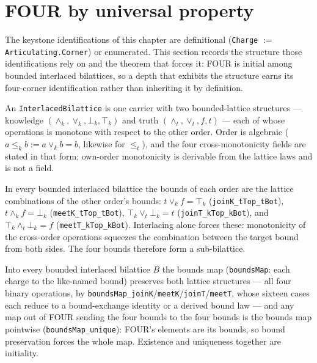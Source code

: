 \section{FOUR by universal property}

The keystone identifications of this chapter are definitional
(\texttt{Charge} $:=$ \texttt{Articulating.Corner}) or enumerated. This section
records the structure those identifications rely on and the theorem that forces
it: FOUR is initial among bounded interlaced bilattices, so a depth that
exhibits the structure earns its four-corner identification rather than
inheriting it by definition.

\begin{proposition}\label{thm:interlaced-bilattice}\leanok{}
An \texttt{InterlacedBilattice} is one carrier with two bounded-lattice
structures --- knowledge $(\wedge_k, \vee_k, \bot_k, \top_k)$ and truth
$(\wedge_t, \vee_t, f, t)$ --- each of whose operations is monotone with
respect to the other order. Order is algebraic
($a \le_k b := a \vee_k b = b$, likewise for $\le_t$), and the four
cross-monotonicity fields are stated in that form; own-order monotonicity is
derivable from the lattice laws and is not a field.
\end{proposition}

\begin{theorem}\label{thm:bound-exchange}\leanok{}
In every bounded interlaced bilattice the bounds of each order are the lattice
combinations of the other order's bounds: $t \vee_k f = \top_k$
(\texttt{joinK\_tTop\_tBot}), $t \wedge_k f = \bot_k$
(\texttt{meetK\_tTop\_tBot}), $\top_k \vee_t \bot_k = t$
(\texttt{joinT\_kTop\_kBot}), and $\top_k \wedge_t \bot_k = f$
(\texttt{meetT\_kTop\_kBot}). Interlacing alone forces these: monotonicity of
the cross-order operations squeezes the combination between the target bound
from both sides. The four bounds therefore form a sub-bilattice.
\end{theorem}

\begin{theorem}\label{thm:four-initial}\leanok{}
Into every bounded interlaced bilattice $B$ the bounds map
(\texttt{boundsMap}: each charge to the like-named bound) preserves both
lattice structures --- all four binary operations, by
\texttt{boundsMap\_joinK}/\texttt{meetK}/\texttt{joinT}/\texttt{meetT}, whose
sixteen cases each reduce to a bound-exchange identity or a derived
bound law --- and any map out of FOUR sending the four bounds to the four
bounds is the bounds map pointwise (\texttt{boundsMap\_unique}): FOUR's
elements are its bounds, so bound preservation forces the whole map. Existence
and uniqueness together are initiality.
\end{theorem}

